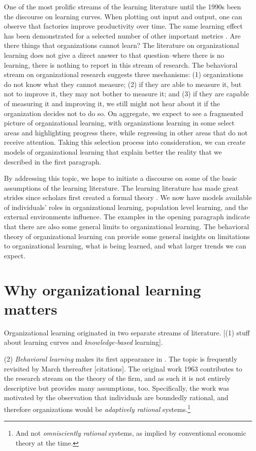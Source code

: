 \documentclass[12pt, man, natbib]{apa6}
\begin{document}
	One of the most prolific streams of the learning literature until the 1990s been the discourse on learning curves. When plotting out input and output, one can observe that factories improve productivity over time. The same learning effect has been demonstrated for a selected number of other important metrics \citep{Argote2013a}. Are there things that organizations cannot learn? The literature on organizational learning does not give a direct answer to that question--where there is no learning, there is nothing to report in this stream of research. The behavioral stream on organizational research suggests three mechanisms: (1) organizations do not know what they cannot measure; (2) if they are able to measure it, but not to improve it, they may not bother to measure it; and (3) if they are capable of measuring it and improving it, we still might not hear about it if the organization decides not to do so. On aggregate, we expect to see a fragmented picture of organizational learning, with organizations learning in some select areas and highlighting progress there, while regressing in other areas that do not receive attention. Taking this selection process into consideration, we can create models of organizational learning that explain better the reality that we described in the first paragraph.
	
	By addressing this topic, we hope to initiate a discourse on some of the basic assumptions of the learning literature. The learning literature has made great strides since scholars first created a formal theory \citep{March1963}. We now have models available of individuals' roles in organizational learning, population level learning, and the external environments influence. The examples in the opening paragraph indicate that there are also some general limits to organizational learning. The behavioral theory of organizational learning can provide some general insights on limitations to organizational learning, what is being learned, and what larger trends we can expect.
	
	\section{Why organizational learning matters}
	
	Organizational learning originated in two separate streams of literature. [(1) stuff about learning curves and \textit{knowledge-based} learning].
	
	(2) \textit{Behavioral learning} makes its first appearance in \citet{March1963}. The topic is frequently revisited by March thereafter [citations]. The original work 1963 contributes to the research stream on the theory of the firm, and as such it is not entirely descriptive but provides many assumptions, too. Specifically, the work was motivated by the observation that individuals are boundedly rational, and therefore organizations would be \textit{adaptively rational} systems.\footnote{And not \textit{omnisciently rational} systems, as implied by conventional economic theory at the time.}
	
\end{document}
